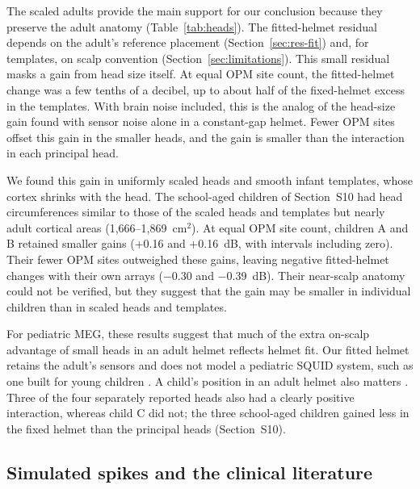 \documentclass[preprint,12pt,authoryear,a4paper]{elsarticle}
\begin{document}
The scaled adults provide the main support for our conclusion because they preserve the adult anatomy (Table~\ref{tab:heads}). The fitted-helmet residual depends on the adult's reference placement (Section~\ref{sec:res-fit}) and, for templates, on scalp convention (Section~\ref{sec:limitations}). This small residual masks a gain from head size itself. At equal OPM site count, the fitted-helmet change was a few tenths of a decibel, up to about half of the fixed-helmet excess in the templates. With brain noise included, this is the analog of the head-size gain \citet{zahran2022} found with sensor noise alone in a constant-gap helmet. Fewer OPM sites offset this gain in the smaller heads, and the gain is smaller than the interaction in each principal head.

We found this gain in uniformly scaled heads and smooth infant templates, whose cortex shrinks with the head. The school-aged children of Section~S10 had head circumferences similar to those of the scaled heads and templates but nearly adult cortical areas (1,666–1,869~cm$^{2}$). At equal OPM site count, children A and B retained smaller gains (+0.16 and +0.16~dB, with intervals including zero). Their fewer OPM sites outweighed these gains, leaving negative fitted-helmet changes with their own arrays (−0.30 and −0.39~dB). Their near-scalp anatomy could not be verified, but they suggest that the gain may be smaller in individual children than in scaled heads and templates.

For pediatric MEG, these results suggest that much of the extra on-scalp advantage of small heads in an adult helmet reflects helmet fit. Our fitted helmet retains the adult's sensors and does not model a pediatric SQUID system, such as one built for young children \citep{tesan2010}. A child's position in an adult helmet also matters \citep{gaetz2008}. Three of the four separately reported heads also had a clearly positive interaction, whereas child C did not; the three school-aged children gained less in the fixed helmet than the principal heads (Section~S10).

\subsection{Simulated spikes and the clinical literature}\label{sec:disc-clinical}
\end{document}
